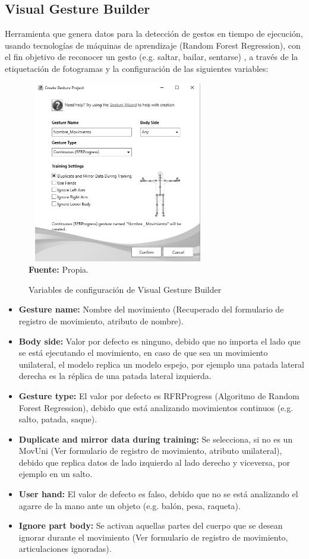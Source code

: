 \subsection{Visual Gesture Builder} \label{ins:VisualGestureBuilder}
Herramienta que genera datos para la detecci\'on de gestos en tiempo de ejecuci\'on, usando tecnolog\'ias de m\'aquinas de aprendizaje (Random Forest Regression), con el fin objetivo de reconocer un gesto (e.g. saltar, bailar, sentarse) \cite{KinectBuilder2019}, a trav\'es de la etiquetaci\'on de fotogramas y la configuraci\'on de las siguientes variables:
 \begin{figure}[H]
	\caption{Variables de configuraci\'on de Visual Gesture Builder}
	\label{fig:visualGesture}
	\centering
	\includegraphics[width=300px,height=300px]{graphics/settingsGesture.PNG} \\
	\textbf{Fuente:} Propia.
\end{figure} 
\begin{itemize}
\item \textbf{Gesture name:} Nombre del movimiento  (Recuperado del formulario de registro de movimiento, atributo de nombre).
\item \textbf{Body side:} Valor por defecto es  ninguno, debido que no importa el lado que se est\'a ejecutando el movimiento, en caso de que sea un movimiento unilateral, el modelo replica un modelo espejo, por ejemplo una patada lateral derecha es la r\'eplica de una patada lateral izquierda.
\item \textbf{Gesture type:} El valor por defecto es RFRProgress (Algoritmo de Random Forest Regression), debido que est\'a analizando movimientos continuos (e.g. salto, patada, saque).
\item \textbf{Duplicate and mirror data during training:} Se selecciona, si no es un \gls{MovUni} (Ver formulario de registro de movimiento, atributo unilateral), debido que replica datos de lado izquierdo al lado derecho y viceversa, por ejemplo en un salto.
\item \textbf{User hand:} El valor de defecto es falso, debido que no se est\'a analizando el agarre de la mano ante un objeto (e.g. bal\'on, pesa, raqueta).
\item \textbf{Ignore part body:} Se activan  aquellas partes del cuerpo que se desean ignorar durante el movimiento (Ver formulario de registro de movimiento, articulaciones ignoradas).
\end{itemize}
